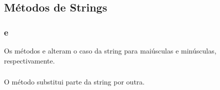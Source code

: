 \documentclass[letterpaper,10pt,english]{jupyterBook}
\begin{document}
\subsection{Métodos de Strings}
\label{\detokenize{chapters/ch6/ch6:metodos-de-strings}}

\subsubsection{ e }
\label{\detokenize{chapters/ch6/ch6:upper-e-lower}}
\sphinxAtStartPar
Os métodos  e  alteram o caso da string para maiúsculas e minúsculas, respectivamente.

\sphinxAtStartPar
{}

\begin{sphinxVerbatim}[commandchars=\\\{\}]
  
  
\end{sphinxVerbatim}

\begin{sphinxVerbatim}[commandchars=\\\{\}]
\end{sphinxVerbatim}


\subsubsection{}
\label{\detokenize{chapters/ch6/ch6:replace}}
\sphinxAtStartPar
O método  substitui parte da string por outra.

\sphinxAtStartPar
{}

\begin{sphinxVerbatim}[commandchars=\\\{\}]
  
   
\end{sphinxVerbatim}
\end{document}
